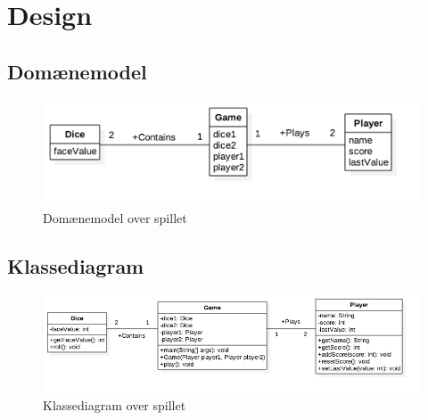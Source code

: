 \chapter{Design}

\section{Domænemodel}

\begin{figure}[h]
    \begin{center}
        \includegraphics[width=15cm]{graphics/Domaenemodel}
        \caption{Domænemodel over spillet}
        \label{fig:domaenemodel}
    \end{center}
\end{figure}

\section{Klassediagram}

\begin{figure}[h]
    \begin{center}
        \includegraphics[width=15cm]{graphics/Klassediagram}
        \caption{Klassediagram over spillet}
        \label{fig:klassediagram}
    \end{center}
\end{figure}